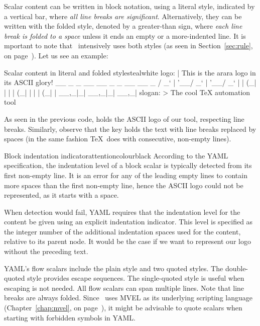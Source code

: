 Scalar content can be written in block notation, using a literal style, indicated by a vertical bar, where \emph{all line breaks are significant}. Alternatively, they can be written with the folded style, denoted by a greater-than sign, where \emph{each line break is folded to a space} unless it ends an empty or a more-indented line. It is mportant to note that \arara\ intensively uses both styles (as seen in Section~\ref{sec:rule}, on page~\pageref{sec:rule}). Let us see an example:

\begin{codebox}{Scalar content in literal and folded styles}{teal}{\icnote}{white}
logo: |
  This is the arara logo
  in its ASCII glory!
    __ _ _ __ __ _ _ __ __ _
   / _` | '__/ _` | '__/ _` |
  | (_| | | | (_| | | | (_| |
   \__,_|_|  \__,_|_|  \__,_|
slogan: >
  The cool TeX
  automation tool
\end{codebox}

As seen in the previous code,  holds the ASCII logo of our tool, respecting line breaks. Similarly, observe that the  key holds the text with line breaks replaced by spaces (in the same fashion \TeX\ does with consecutive, non-empty lines).

\begin{messagebox}{Block indentation indicator}{attentioncolour}{\icattention}{black}
\setlength{\parskip}{1em}
According to the YAML specification, the indentation level of a block scalar is typically detected from its first non-empty line. It is an error for any of the leading empty lines to contain more spaces than the first non-empty line, hence the ASCII logo could not be represented, as it starts with a space.

When detection would fail, YAML requires that the indentation level for the content be given using an explicit indentation indicator. This level is specified as the integer number of the additional indentation spaces used for the content, relative to its parent node. It would be the case if we want to represent our logo without the preceding text.
\end{messagebox}

YAML's flow scalars include the plain style and two quoted styles. The double-quoted style provides escape sequences. The single-quoted style is useful when escaping is not needed. All flow scalars can span multiple lines. Note that line breaks are always folded. Since \arara\ uses MVEL as its underlying scripting language (Chapter~\ref{chap:mvel}, on page~\pageref{chap:mvel}), it might be advisable to quote scalars when starting with forbidden symbols in YAML.

